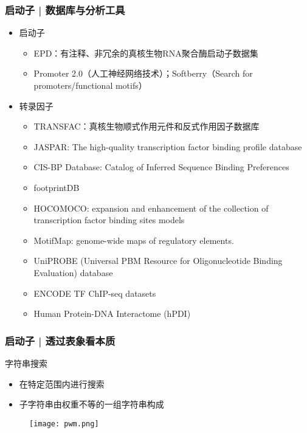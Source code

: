 \begin{frame}
  \frametitle{启动子 | 数据库与分析工具}
  \begin{itemize}
    \item 启动子
      \begin{itemize}
	      \item EPD：有注释、非冗余的真核生物RNA聚合酶启动子数据集
        \item Promoter 2.0（人工神经网络技术）；Softberry（Search for promoters/functional motifs）
      \end{itemize}
    \item 转录因子
      \begin{itemize}
        \item TRANSFAC：真核生物顺式作用元件和反式作用因子数据库
        \item JASPAR: The high-quality transcription factor binding profile database
        \item CIS-BP Database: Catalog of Inferred Sequence Binding Preferences
        \item footprintDB
        \item HOCOMOCO: expansion and enhancement of the collection of transcription factor binding sites models
        \item MotifMap: genome-wide maps of regulatory elements.
        \item UniPROBE (Universal PBM Resource for Oligonucleotide Binding Evaluation) database
        \item ENCODE TF ChIP-seq datasets
        \item Human Protein-DNA Interactome (hPDI)
      \end{itemize}
  \end{itemize}
\end{frame}

\begin{frame}
  \frametitle{启动子 | 透过表象看本质}
  \begin{block}{字符串搜索}
    \begin{itemize}
      \item 在特定范围内进行搜索
      \item 子字符串由权重不等的一组字符串构成
    \end{itemize}
  \end{block}
  \begin{figure}
    \centering
    \texttt{[image: pwm.png]}
  \end{figure}
\end{frame}

